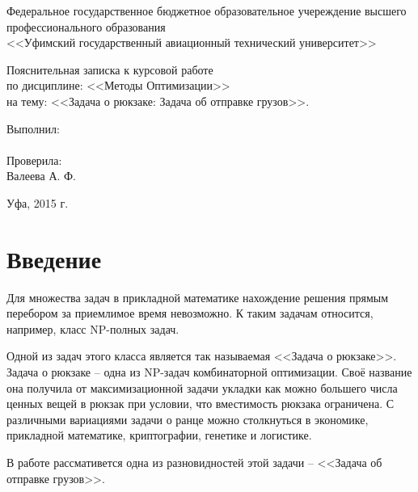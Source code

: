 \documentclass[14pt,a4paper]{extarticle}
\author{Пахтусов Н. Г., ПРО-306}
\begin{document}
\begin{center}
\thispagestyle{empty} 

Федеральное государственное бюджетное образовательное учереждение высшего \\
профессионального образования\\
<<Уфимский государственный авиационный технический университет>>
\vspace*{\fill}
\begingroup
\centering

Пояснительная записка к курсовой работе\\
по дисциплине: <<Методы Оптимизации>>\\
на тему: <<Задача о рюкзаке: Задача об отправке грузов>>.

\endgroup
\vspace*{\fill}

\end{center}

\begin{flushright}

Выполнил:\\
\@author \\
Проверила: \\
Валеева А. Ф.

\end{flushright}

\begin{center}
Уфа, 2015 г.
\end{center}

\clearpage
\tableofcontents
\clearpage

\section{Введение}

	Для множества задач в прикладной математике нахождение решения прямым перебором за приемлимое время невозможно. К таким задачам относится, например, класс NP-полных задач.
	
	Одной из задач этого класса является так называемая <<Задача о рюкзаке>>. Задача о рюкзаке -- одна из NP-задач комбинаторной оптимизации. Своё название она получила от максимизационной задачи укладки как можно большего числа ценных вещей в рюкзак при условии, что вместимость рюкзака ограничена. С различными вариациями задачи о ранце можно столкнуться в экономике, прикладной математике, криптографии, генетике и логистике.
	
	В работе рассмативется одна из разновидностей этой задачи -- <<Задача об отправке грузов>>. 
\end{document}
